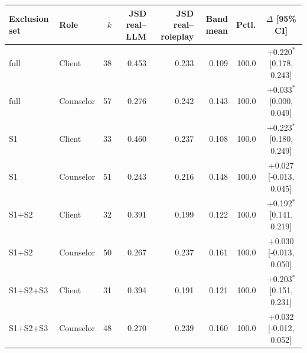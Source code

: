 \begin{tabular}{llrrrrrc}
\toprule
Exclusion set & Role & $k$ & JSD real--LLM & JSD real--roleplay & Band mean & Pctl. & $\Delta$ [95\% CI] \\
\midrule
full & Client & 38 & 0.453 & 0.233 & 0.109 & 100.0 & +0.220$^{*}$ [0.178, 0.243] \\
full & Counselor & 57 & 0.276 & 0.242 & 0.143 & 100.0 & +0.033$^{*}$ [0.000, 0.049] \\
S1 & Client & 33 & 0.460 & 0.237 & 0.108 & 100.0 & +0.223$^{*}$ [0.180, 0.249] \\
S1 & Counselor & 51 & 0.243 & 0.216 & 0.148 & 100.0 & +0.027 [-0.013, 0.045] \\
S1+S2 & Client & 32 & 0.391 & 0.199 & 0.122 & 100.0 & +0.192$^{*}$ [0.141, 0.219] \\
S1+S2 & Counselor & 50 & 0.267 & 0.237 & 0.161 & 100.0 & +0.030 [-0.013, 0.050] \\
S1+S2+S3 & Client & 31 & 0.394 & 0.191 & 0.121 & 100.0 & +0.203$^{*}$ [0.151, 0.231] \\
S1+S2+S3 & Counselor & 48 & 0.270 & 0.239 & 0.160 & 100.0 & +0.032 [-0.012, 0.052] \\
\bottomrule
\end{tabular}
